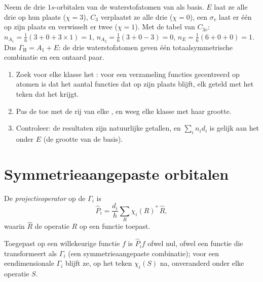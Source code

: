 \begin{example}\label{ex:b3:group-theory-applied:nh3}
Neem de drie $1s$-orbitalen van de waterstofatomen van  als basis. $E$
laat ze alle drie op hun plaats ($\chi = 3$), $C_3$ verplaatst ze alle drie
($\chi = 0$), een
$\sigma_v$ laat er één op zijn plaats en verwisselt er twee ($\chi = 1$). Met de
tabel van $C_{3v}$:
$n_{A_1} = \frac16(3 + 0 + 3\times1) = 1$, $n_{A_2} = \frac16(3 + 0 - 3) = 0$,
$n_E = \frac16(6 + 0 + 0) = 1$. Dus $\Gamma_{\mathrm H} = A_1 + E$: de drie
waterstofatomen geven één totaalsymmetrische combinatie en een ontaard paar.
\end{example}

\begin{method}\label{met:b3:group-theory-applied:reduce}
\begin{enumerate}
  \item Zoek voor elke klasse het : voor een verzameling functies
        gecentreerd op atomen is dat het aantal functies dat op zijn plaats
        blijft, elk geteld met het teken dat het krijgt.
  \item Pas de  toe met de rij van elke , en weeg elke klasse met haar grootte.
  \item Controleer: de resultaten zijn natuurlijke getallen, en $\sum_in_id_i$
        is gelijk aan het  onder $E$ (de grootte van de basis).
\end{enumerate}
\end{method}

\section{Symmetrieaangepaste orbitalen}

\begin{definition}[Projectieoperator]\label{def:b3:group-theory-applied:projection}
De \emph{projectieoperator} op de  $\Gamma_i$ is
\[
\hat P_i = \frac{d_i}{h}\sum_R\chi_i(R)^*\,\hat R,
\]
waarin $\hat R$ de operatie $R$ op een functie toepast.
\end{definition}

\begin{proposition}\label{prop:b3:group-theory-applied:projection}
Toegepast op een willekeurige functie $f$ is $\hat P_if$ ofwel nul, ofwel
een functie die transformeert als $\Gamma_i$ (een symmetrieaangepaste
combinatie); voor een
eendimensionale $\Gamma_i$ blijft ze, op het teken $\chi_i(S)$ na,
onveranderd onder elke operatie $S$.
\end{proposition}

